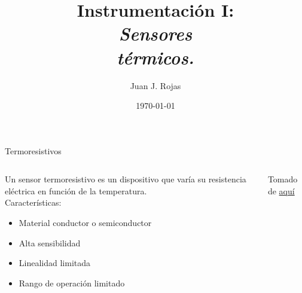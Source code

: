 \documentclass[aspectratio=169]{beamer}
\title{Instrumentación I: \\ \emph{Sensores}\\ \emph{térmicos.}}
\author{
    Juan J. Rojas
}
\institute{Instituto Tecnológico de Costa Rica}
\date{\today}
\begin{document}

\maketitle

\newcommand{\blackandwhite}{white} %

\begin{frame}{Termoresistivos}
    \begin{columns}[c, onlytextwidth]
        \begin{column}{0.5\textwidth}
        Un sensor termoresistivo es un dispositivo que varía su resistencia eléctrica en función de la temperatura.\\[8pt]
        Características: 
            \begin{itemize}
                \item Material conductor o semiconductor
                \item Alta sensibilidad
                \item Linealidad limitada
                \item Rango de operación limitado
            \end{itemize}    
        \end{column}
        \begin{column}{0.5\textwidth}
            \begin{center}
               \tiny{Tomado de \href{https://www.electroschematics.com/ntc-thermistor-circuit/}{aquí}}
            \end{center}
        \end{column}
    \end{columns}
\end{frame}
\end{document}
